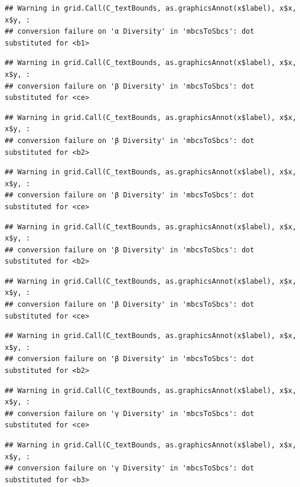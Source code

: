 \documentclass[
]{article}
\begin{document}
\begin{verbatim}
## Warning in grid.Call(C_textBounds, as.graphicsAnnot(x$label), x$x, x$y, :
## conversion failure on 'α Diversity' in 'mbcsToSbcs': dot substituted for <b1>
\end{verbatim}

\begin{verbatim}
## Warning in grid.Call(C_textBounds, as.graphicsAnnot(x$label), x$x, x$y, :
## conversion failure on 'β Diversity' in 'mbcsToSbcs': dot substituted for <ce>
\end{verbatim}

\begin{verbatim}
## Warning in grid.Call(C_textBounds, as.graphicsAnnot(x$label), x$x, x$y, :
## conversion failure on 'β Diversity' in 'mbcsToSbcs': dot substituted for <b2>
\end{verbatim}

\begin{verbatim}
## Warning in grid.Call(C_textBounds, as.graphicsAnnot(x$label), x$x, x$y, :
## conversion failure on 'β Diversity' in 'mbcsToSbcs': dot substituted for <ce>
\end{verbatim}

\begin{verbatim}
## Warning in grid.Call(C_textBounds, as.graphicsAnnot(x$label), x$x, x$y, :
## conversion failure on 'β Diversity' in 'mbcsToSbcs': dot substituted for <b2>
\end{verbatim}

\begin{verbatim}
## Warning in grid.Call(C_textBounds, as.graphicsAnnot(x$label), x$x, x$y, :
## conversion failure on 'β Diversity' in 'mbcsToSbcs': dot substituted for <ce>
\end{verbatim}

\begin{verbatim}
## Warning in grid.Call(C_textBounds, as.graphicsAnnot(x$label), x$x, x$y, :
## conversion failure on 'β Diversity' in 'mbcsToSbcs': dot substituted for <b2>
\end{verbatim}

\begin{verbatim}
## Warning in grid.Call(C_textBounds, as.graphicsAnnot(x$label), x$x, x$y, :
## conversion failure on 'γ Diversity' in 'mbcsToSbcs': dot substituted for <ce>
\end{verbatim}

\begin{verbatim}
## Warning in grid.Call(C_textBounds, as.graphicsAnnot(x$label), x$x, x$y, :
## conversion failure on 'γ Diversity' in 'mbcsToSbcs': dot substituted for <b3>
\end{verbatim}
\end{document}
